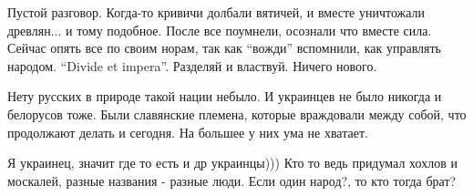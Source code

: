 \begin{itemize}

Пустой разговор. Когда-то кривичи долбали вятичей, и вместе уничтожали
древлян... и тому подобное. После все поумнели, осознали что вместе сила.
Сейчас опять все по своим норам, так как \enquote{вожди} вспомнили, как управлять
народом. \enquote{Divide et impera}. Разделяй и властвуй. Ничего нового.


Нету русских в природе такой нации небыло. И украинцев не было никогда и
белорусов тоже. Были славянские племена, которые враждовали между собой, что
продолжают делать и сегодня. На большее у них ума не хватает.


Я украинец, значит где то есть и др украинцы)))
Кто то ведь придумал хохлов и москалей, разные названия - разные люди.
Если один народ?, то кто тогда брат?

\end{itemize} %
